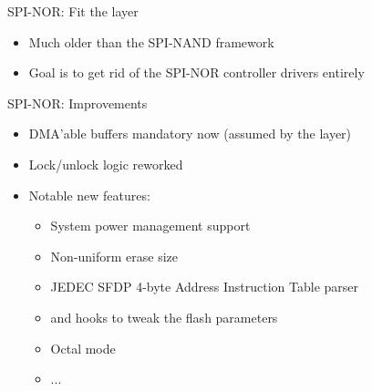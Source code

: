 \documentclass[aspectratio=169,obeyspaces,spaces,hyphens,dvipsnames]{beamer}
\begin{document}
\begin{frame}{SPI-NOR: Fit the {\bf{}} layer}
  \begin{itemize}
  \item Much older than the SPI-NAND framework
    \vfill
  \vfill
  \item Goal is to get rid of the SPI-NOR controller drivers entirely
  \end{itemize}
\end{frame}

\begin{frame}{SPI-NOR: Improvements}
  \begin{itemize}
  \item DMA'able buffers mandatory now (assumed by the 
    layer)
    \vfill
  \item Lock/unlock logic reworked
    \vfill
  \item Notable new features:
    \begin{itemize}
    \item System power management support
    \item Non-uniform erase size
    \item JEDEC SFDP 4-byte Address Instruction Table parser
    \item {} and  hooks to
      tweak the flash parameters
    \item Octal mode
    \item ...
    \end{itemize}
  \end{itemize}
\end{frame}
\end{document}
